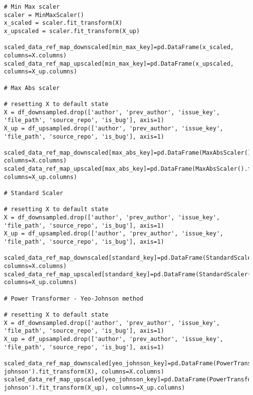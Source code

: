 \begin{landscape}
\begin{code}
\label{code:scalers:execute-scalers}
\begin{verbatim}
# Min Max scaler
scaler = MinMaxScaler()
x_scaled = scaler.fit_transform(X)
x_upscaled = scaler.fit_transform(X_up)

scaled_data_ref_map_downscaled[min_max_key]=pd.DataFrame(x_scaled, columns=X.columns)
scaled_data_ref_map_upscaled[min_max_key]=pd.DataFrame(x_upscaled, columns=X_up.columns)

# Max Abs scaler

# resetting X to default state
X = df_downsampled.drop(['author', 'prev_author', 'issue_key', 'file_path', 'source_repo', 'is_bug'], axis=1)
X_up = df_upsampled.drop(['author', 'prev_author', 'issue_key', 'file_path', 'source_repo', 'is_bug'], axis=1)

scaled_data_ref_map_downscaled[max_abs_key]=pd.DataFrame(MaxAbsScaler().fit_transform(X), columns=X.columns)
scaled_data_ref_map_upscaled[max_abs_key]=pd.DataFrame(MaxAbsScaler().fit_transform(X_up), columns=X_up.columns)

# Standard Scaler

# resetting X to default state
X = df_downsampled.drop(['author', 'prev_author', 'issue_key', 'file_path', 'source_repo', 'is_bug'], axis=1)
X_up = df_upsampled.drop(['author', 'prev_author', 'issue_key', 'file_path', 'source_repo', 'is_bug'], axis=1)

scaled_data_ref_map_downscaled[standard_key]=pd.DataFrame(StandardScaler(with_mean=False).fit_transform(X), columns=X.columns)
scaled_data_ref_map_upscaled[standard_key]=pd.DataFrame(StandardScaler(with_mean=False).fit_transform(X_up), columns=X_up.columns)

# Power Transformer - Yeo-Johnson method

# resetting X to default state
X = df_downsampled.drop(['author', 'prev_author', 'issue_key', 'file_path', 'source_repo', 'is_bug'], axis=1)
X_up = df_upsampled.drop(['author', 'prev_author', 'issue_key', 'file_path', 'source_repo', 'is_bug'], axis=1)

scaled_data_ref_map_downscaled[yeo_johnson_key]=pd.DataFrame(PowerTransformer(method='yeo-johnson').fit_transform(X), columns=X.columns)
scaled_data_ref_map_upscaled[yeo_johnson_key]=pd.DataFrame(PowerTransformer(method='yeo-johnson').fit_transform(X_up), columns=X_up.columns)



\end{verbatim}
\end{code}
\end{landscape}
